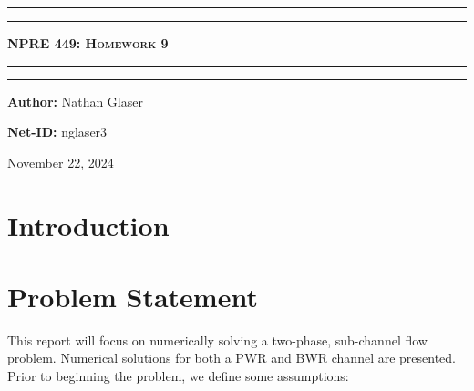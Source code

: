 \documentclass{article}
\begin{document}
\newcommand{\circled}[1]{\tikz[baseline=(char.base)]{
            \node[shape=circle,draw,inner sep=2pt] (char) {#1};}}

\newcommand{\pd}[3]{\frac{\partial^{#3}#1}{\partial {#2}^{#3}}}
\begin{titlepage}

\centering
\scshape
\vspace{\baselineskip}

%
\rule{\textwidth}{1.6pt}\vspace*{-\baselineskip}\vspace*{2pt}
\rule{\textwidth}{0.4pt}

{\Huge \textbf{\textsc{NPRE 449: Homework 9 \\
\vspace{15pt}}}}

\rule{\textwidth}{0.4pt}\vspace*{-\baselineskip}\vspace{3.2pt}
\rule{\textwidth}{1.6pt}\vspace{6pt}
\vspace{1.5\baselineskip}


\large \centerline{\textbf{Author:} Nathan Glaser}
\large \centerline{\textbf{Net-ID:} nglaser3}
\quad

\vfill
\large \centerline{November 22, 2024}
%
\end{titlepage}

\tableofcontents
\clearpage
\listoffigures
\clearpage
\listoftables
\clearpage
{}

\section{Introduction}

\clearpage
\section{Problem Statement}

This report will focus on numerically solving a two-phase, sub-channel flow problem. Numerical solutions for both a PWR and BWR channel are presented. Prior to beginning the problem, we define some assumptions:
\end{document}
